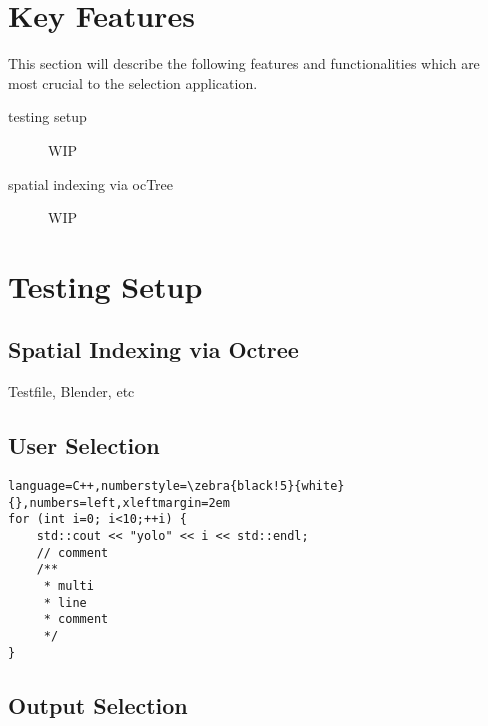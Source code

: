 \section{Key Features}
\label{sec:key_features}
This section will describe the following features and functionalities which are most crucial to the selection application.

\begin{description}
	\item[testing setup] WIP
	\item[spatial indexing via ocTree] WIP
\end{description}

\section{Testing Setup}
\label{sec:testing_setup}

\subsection{Spatial Indexing via Octree}
\label{sec:spatial_indexing_via_octree}
Testfile, Blender, etc

\subsection{User Selection}
\label{sec:user_selection}

\begin{lstlisting}
language=C++,numberstyle=\zebra{black!5}{white}{},numbers=left,xleftmargin=2em
for (int i=0; i<10;++i) {
	std::cout << "yolo" << i << std::endl;
	// comment
	/**
	 * multi
	 * line
	 * comment
	 */
}
\end{lstlisting}

\subsection{Output Selection}
\label{sec:output_selection}
